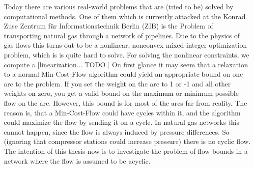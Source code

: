
Today there are various real-world problems that are (tried to be) solved by computational methods. One of them which 
is currently attacked at the Konrad Zuse Zentrum für Informationstechnik Berlin (ZIB) is the Problem of transporting 
natural gas through a network of pipelines. Due to the physics of gas flows this turns out to be a nonlinear, nonconvex 
mixed-integer optimization problem, which is is quite hard to solve. 
For solving the nonlinear constraints, we compute a [linearization... TODO ]
On first glance it may seem that a relaxation to a normal Min-Cost-Flow algorithm could yield an appropriate bound 
on one arc to the problem. If you set the weight on the arc to 1 or -1 and all other weights on zero, you get a 
valid bound on the maximum or minimum possible flow on the arc. However, this bound is for most of the arcs far from 
reality. The reason is, that a Min-Cost-Flow could have cycles within it, and the algorithm could maximize the flow by 
sending it on a cycle. In natural gas networks this cannot happen, since the flow is always induced by pressure 
differences. So (ignoring that compressor stations could increase pressure) there is no cyclic flow. 
The intention of this thesis now is to investigate the problem of flow bounds in a network where the flow is assumed 
to be acyclic. 

